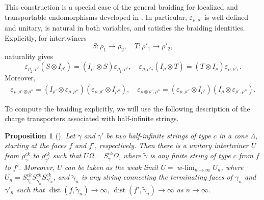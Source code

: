 \documentclass[a4paper,11pt]{article}
\newtheorem{proposition}[theorem]{Proposition}
\theoremstyle{definition}
\theoremstyle{remark}
\theoremstyle{remark}
\begin{document}
This construction is a special case of the general braiding for
localized and transportable endomorphisms developed in
\cite{Ogata2022braided}. In particular,
$\varepsilon_{\rho,\rho'}$ is well defined and unitary, is natural in
both variables, and satisfies the braiding identities. Explicitly, for
intertwiners
\[
    S:\rho_1\to\rho_2, \quad T:\rho'_1\to\rho'_2,
\]
naturality gives
\begin{equation}
    \varepsilon_{\rho_2,\rho'}(S\otimes I_{\rho'})  = (I_{\rho'}\otimes S)\varepsilon_{\rho_1,\rho'}, \quad 
    \varepsilon_{\rho,\rho'_2}(I_\rho\otimes T)  = (T\otimes I_\rho)\varepsilon_{\rho,\rho'_1}. \label{eq:braid_nat} 
\end{equation}
Moreover,
\begin{align}
    \varepsilon_{\rho,\rho'\otimes \rho''}  = (I_{\rho'}\otimes \varepsilon_{\rho,\rho''})(\varepsilon_{\rho,\rho'}\otimes I_{\rho''}), \quad 
    \varepsilon_{\rho\otimes \rho',\rho''}  = (\varepsilon_{\rho,\rho''}\otimes I_{\rho'})(I_\rho\otimes\varepsilon_{\rho',\rho''}). \label{eq:braid_hexagon}
\end{align}


To compute the braiding explicitly, we will use the following
description of the charge transporters associated with half-infinite
strings.

\begin{proposition}[{\cite[Lemma~4.1, Theorem~4.1]{naaijkens2011localized}}] \label{prop:unitary}
    Let $\gamma$ and $\gamma'$ be two half-infinite strings of type $c$ in a cone $\Lambda$, starting at the faces $f$ and $f'$, respectively. Then there is a unitary intertwiner $U$ from $\rho_{\gamma}^{ck}$ to $\rho_{\gamma'}^{ck}$ such that $U\Omega=S_{\tilde{\gamma}}^{ck}\Omega$, where $\tilde{\gamma}$ is any finite string of type $c$ from $f$ to $f'$. Moreover, $U$ can be taken as the weak limit $U=\operatorname{\textit{w}\text{-}lim}_{n\to\infty} U_n$, where $U_n = S_{\gamma_n}^{ck}S_{\tilde{\gamma}_n}^{ck}S_{\gamma'_n}^{ck}$, and $\tilde{\gamma}_n$ is any string connecting the terminating faces of $\gamma_n$ and $\gamma'_n$ such that $\operatorname{dist}(f,\tilde{\gamma}_n)\to\infty$, $\operatorname{dist}(f',\tilde{\gamma}_n)\to\infty$ as $n\to\infty$.
\end{proposition}
\end{document}

